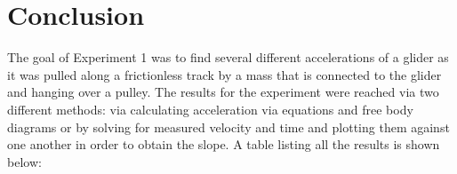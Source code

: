 \documentclass[titlepage]{article}
\begin{document}
\pagebreak

\section{Conclusion}
The goal of Experiment 1 was to find several different accelerations of a glider as it was pulled along a frictionless track by a mass that is connected to the glider and hanging over a pulley. The results for the experiment were reached via two different methods: via calculating acceleration via equations and free body diagrams or by solving for measured velocity and time and plotting them against one another in order to obtain the slope. A table listing all the results is shown below:


\begin{table}[!htbp]
\renewcommand{\arraystretch}{1.3}
\centering
{}
\caption{Combined data for Table 2 and Table 3}
\end{table}
\end{document}
